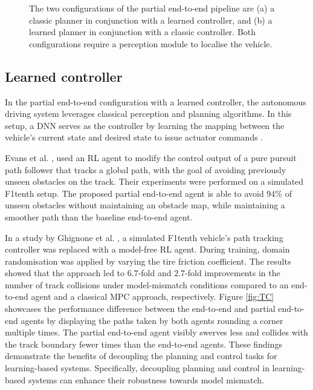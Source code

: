 \begin{figure}[htb!]
    \centering
    \begin{subfigure}[htb!]{\textwidth}
        \centering
        
        \caption[]{}
        \label{fig:pete_learned_control}
    \end{subfigure}
    \hfill
    \begin{subfigure}[htb!]{\textwidth}
        \centering
        
        \caption[]{}
        \label{fig:pete_learned_trajectory_planning}
    \end{subfigure}
\caption[Configurations of the partial end-to-end pipeline]{The two configurations of the partial end-to-end pipeline are (a) a classic planner in conjunction with a learned controller, and (b) a learned planner in conjunction with a classic controller. Both configurations require a perception module to localise the vehicle.}
\label{fig:pete}
\end{figure}



\subsection{Learned controller}
\label{sec:learned_controller}
In the partial end-to-end configuration with a learned controller, 
the autonomous driving system leverages classical perception and planning algorithms. 
In this setup, a DNN serves as the controller by learning the mapping between the vehicle's current state and desired state to issue actuator commands \cite{Betz2021}.

Evans et al. \cite{Evans2021b}, used an RL agent to modify the control output of a pure pursuit path follower that tracks a global path, with the goal of avoiding previously unseen obstacles on the track.
Their experiments were performed on a simulated F1tenth setup.
The proposed partial end-to-end agent is able to avoid $94\%$ of unseen obstacles without maintaining an obstacle map, while maintaining a smoother path than the baseline end-to-end agent.

In a study by Ghignone et al. \cite{Ghignone2022}, a simulated F1tenth vehicle's path tracking controller was replaced with a model-free RL agent. 
During training, domain randomisation was applied by varying the tire friction coefficient. 
The results showed that the approach led to $6.7$-fold and $2.7$-fold improvements in the number of track collisions under model-mismatch conditions compared to an end-to-end agent and a classical MPC approach, respectively. 
Figure \ref{fig:TC} showcases the performance difference between the end-to-end and partial end-to-end agents by displaying the paths taken by both agents rounding a corner multiple times.
The partial end-to-end agent visibly swerves less and collides with the track boundary fewer times than the end-to-end agents.
These findings demonstrate the benefits of decoupling the planning and control tasks for learning-based systems. 
Specifically, decoupling planning and control in learning-based systems can enhance their robustness towards model mismatch.

